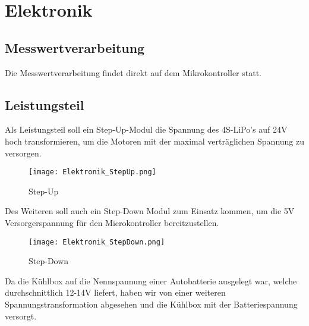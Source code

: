 \section{Elektronik}

\subsection{Messwertverarbeitung}
Die Messwertverarbeitung findet direkt auf dem Mikrokontroller statt.

\subsection{Leistungsteil}
Als Leistungsteil soll ein Step-Up-Modul die Spannung des 4S-LiPo’s auf 24V hoch transformieren, um die Motoren mit der maximal verträglichen Spannung zu versorgen. 

\begin{figure}[H]
    \begin{center}
    \texttt{[image: Elektronik\_StepUp.png]}
    \end{center}
    \caption{Step-Up}
\end{figure}

Des Weiteren soll auch ein Step-Down Modul zum Einsatz kommen, um die 5V Versorgerspannung für den Microkontroller bereitzustellen. 

\begin{figure}[H]
    \begin{center}
    \texttt{[image: Elektronik\_StepDown.png]}
    \end{center}
    \caption{Step-Down}
\end{figure}

Da die Kühlbox auf die Nennspannung einer Autobatterie ausgelegt war, welche durchschnittlich 12-14V liefert, haben wir von einer weiteren Spannungstransformation abgesehen und die Kühlbox mit der Batteriespannung versorgt.

